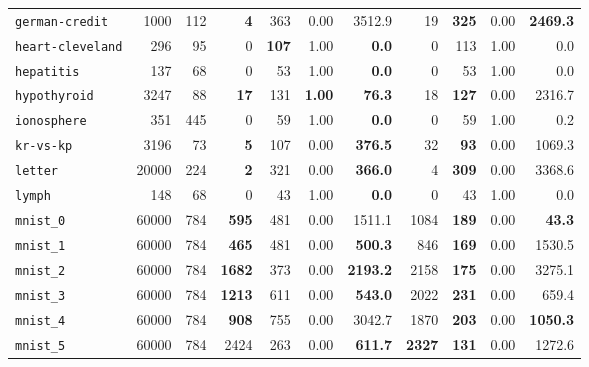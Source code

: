 \begin{tabular}{lccrrrrrrrr}
\texttt{german-credit} & \multicolumn{1}{r}{1000} & \multicolumn{1}{r}{112}  & \textbf{4} & 363 & 0.00 & 3512.9 & 19 & \textbf{325} & 0.00 & \textbf{2469.3}\\
\texttt{heart-cleveland} & \multicolumn{1}{r}{296} & \multicolumn{1}{r}{95}  & 0 & \textbf{107} & 1.00 & \textbf{0.0} & 0 & 113 & 1.00 & 0.0\\
\texttt{hepatitis} & \multicolumn{1}{r}{137} & \multicolumn{1}{r}{68}  & 0 & 53 & 1.00 & \textbf{0.0} & 0 & 53 & 1.00 & 0.0\\
\texttt{hypothyroid} & \multicolumn{1}{r}{3247} & \multicolumn{1}{r}{88}  & \textbf{17} & 131 & \textbf{1.00} & \textbf{76.3} & 18 & \textbf{127} & 0.00 & 2316.7\\
\texttt{ionosphere} & \multicolumn{1}{r}{351} & \multicolumn{1}{r}{445}  & 0 & 59 & 1.00 & \textbf{0.0} & 0 & 59 & 1.00 & 0.2\\
\texttt{kr-vs-kp} & \multicolumn{1}{r}{3196} & \multicolumn{1}{r}{73}  & \textbf{5} & 107 & 0.00 & \textbf{376.5} & 32 & \textbf{93} & 0.00 & 1069.3\\
\texttt{letter} & \multicolumn{1}{r}{20000} & \multicolumn{1}{r}{224}  & \textbf{2} & 321 & 0.00 & \textbf{366.0} & 4 & \textbf{309} & 0.00 & 3368.6\\
\texttt{lymph} & \multicolumn{1}{r}{148} & \multicolumn{1}{r}{68}  & 0 & 43 & 1.00 & \textbf{0.0} & 0 & 43 & 1.00 & 0.0\\
\texttt{mnist\_0} & \multicolumn{1}{r}{60000} & \multicolumn{1}{r}{784}  & \textbf{595} & 481 & 0.00 & 1511.1 & 1084 & \textbf{189} & 0.00 & \textbf{43.3}\\
\texttt{mnist\_1} & \multicolumn{1}{r}{60000} & \multicolumn{1}{r}{784}  & \textbf{465} & 481 & 0.00 & \textbf{500.3} & 846 & \textbf{169} & 0.00 & 1530.5\\
\texttt{mnist\_2} & \multicolumn{1}{r}{60000} & \multicolumn{1}{r}{784}  & \textbf{1682} & 373 & 0.00 & \textbf{2193.2} & 2158 & \textbf{175} & 0.00 & 3275.1\\
\texttt{mnist\_3} & \multicolumn{1}{r}{60000} & \multicolumn{1}{r}{784}  & \textbf{1213} & 611 & 0.00 & \textbf{543.0} & 2022 & \textbf{231} & 0.00 & 659.4\\
\texttt{mnist\_4} & \multicolumn{1}{r}{60000} & \multicolumn{1}{r}{784}  & \textbf{908} & 755 & 0.00 & 3042.7 & 1870 & \textbf{203} & 0.00 & \textbf{1050.3}\\
\texttt{mnist\_5} & \multicolumn{1}{r}{60000} & \multicolumn{1}{r}{784}  & 2424 & 263 & 0.00 & \textbf{611.7} & \textbf{2327} & \textbf{131} & 0.00 & 1272.6\\

\end{tabular}
